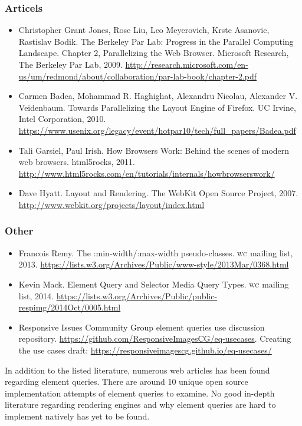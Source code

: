 \documentclass[oneside,a4paper,11pt]{kth-mag}
\begin{document}
\subsubsection*{Articels}
\begin{itemize}
\item Christopher Grant Jones, Rose Liu, Leo Meyerovich, Krste Asanovic, Rastislav Bodik. The Berkeley Par Lab: Progress in the Parallel Computing Landscape. Chapter 2, Parallelizing the Web Browser. Microsoft Research, The Berkeley Par Lab, 2009. \url{http://research.microsoft.com/en-us/um/redmond/about/collaboration/par-lab-book/chapter-2.pdf}
\item Carmen Badea, Mohammad R. Haghighat, Alexandru Nicolau, Alexander V. Veidenbaum. Towards Parallelizing the Layout Engine of Firefox. UC Irvine, Intel Corporation, 2010. \url{https://www.usenix.org/legacy/event/hotpar10/tech/full_papers/Badea.pdf}
\item Tali Garsiel, Paul Irish. How Browsers Work: Behind the scenes of modern web browsers. html5rocks, 2011. \url{http://www.html5rocks.com/en/tutorials/internals/howbrowserswork/}
\item Dave Hyatt. Layout and Rendering. The WebKit Open Source Project, 2007. \url{http://www.webkit.org/projects/layout/index.html}
\end{itemize}

\subsubsection{Other}
\begin{itemize}
\item Francois Remy. The :min-width/:max-width pseudo-classes. \textsc{w}\textsc{c} mailing list, 2013. \url{https://lists.w3.org/Archives/Public/www-style/2013Mar/0368.html}
\item Kevin Mack. Element Query and Selector Media Query Types. \textsc{w}\textsc{c} mailing list, 2014. \url{https://lists.w3.org/Archives/Public/public-respimg/2014Oct/0005.html}
\item Responsive Issues Community Group element queries use discussion repository. \url{https://github.com/ResponsiveImagesCG/eq-usecases}. Creating the use cases draft: \url{https://responsiveimagescg.github.io/eq-usecases/}
\end{itemize}

In addition to the listed literature, numerous web articles has been found regarding element queries. There are around 10 unique open source implementation attempts of element queries to examine. No good in-depth literature regarding rendering engines and why element queries are hard to implement natively has yet to be found.
\end{document}
